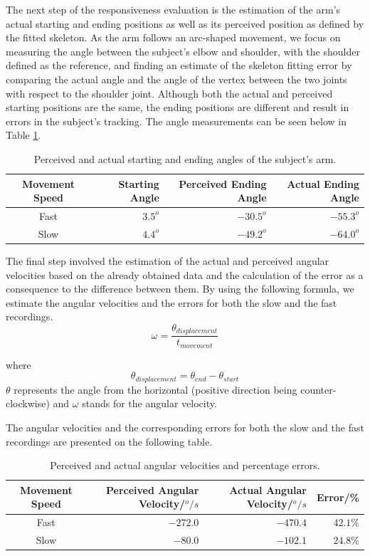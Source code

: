 \documentclass[10pt,a4paper]{article}
\begin{document}
\noindent
The next step of the responsiveness evaluation is the estimation of the arm's actual starting and ending positions as well as its perceived position as defined by the fitted skeleton. As the arm follows an arc-shaped movement, we focus on measuring the angle between the subject's elbow and shoulder, with the shoulder  defined as the reference, and finding an estimate of the skeleton fitting error by comparing the actual angle and the angle of the vertex between the two joints with respect to the shoulder joint. Although both the actual and perceived starting positions are the same, the ending positions are different and result in errors in the subject's tracking. The angle measurements can be seen below in Table \ref{angle}.

\begin{table}[H]
\center
\begin{tabular}{| c | r | r | r |}
\hline
Movement Speed & Starting Angle & Perceived Ending Angle & Actual Ending Angle\\
\hline
Fast & $3.5^o$ & $-30.5^o$ & $-55.3^o$\\
Slow & $4.4^o$ & $-49.2^o$ & $-64.0^o$\\
\hline
\end{tabular}
\caption{Perceived and actual starting and ending angles of the subject's arm.}
\label{angle}
\end{table}

\noindent
The final step involved the estimation of the actual and perceived angular velocities based on the already obtained data and the calculation of the error as a consequence to the difference between them. By using the following formula, we estimate the angular velocities and the errors for both the slow and the fast recordings.
\begin{equation}
\omega = \frac{\theta_{displacement}}{t_{movement}} 
\end{equation}

\noindent where \[\theta_{displacement} = \theta_{end} - \theta_{start}\]
$\theta$ represents the angle from the horizontal (positive direction being counter-clockwise) and $\omega$ stands for the angular velocity.
 
\noindent 
The angular velocities and the corresponding errors for both the slow and the fast recordings are presented on the following table.

\begin{table}[H]
\center
\begin{tabular}{| c | r | r | r |}
\hline
Movement Speed & Perceived Angular Velocity/$^o/s$ & Actual Angular Velocity/$^o/s$ & Error/\% \\
\hline
Fast & $-272.0$ & $-470.4$ & $42.1\%$ \\
Slow & $-80.0$ & $-102.1$ & $24.8\%$ \\
\hline
\end{tabular}
\caption{Perceived and actual angular velocities and percentage errors.}
\end{table}
\end{document}
